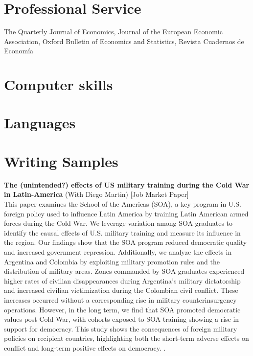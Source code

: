 \documentclass{moderncv}
\begin{document}
\section{\textbf{Professional Service}}
{The Quarterly Journal of Economics,  Journal of the European Economic Association,  Oxford Bulletin of Economics and Statistics, Revista Cuadernos de Econom\'ia \\ }


\section{\textbf{Computer skills}}
 {}{}

\section{\textbf{Languages}}

\pagebreak 
\section{\textbf{Writing Samples}}

{\textbf{The (unintended?) effects of US military training during the Cold War in Latin-America} (With Diego Martin) [Job Market Paper] \\ }
{This paper examines the School of the Americas (SOA), a key program in U.S. foreign policy used to influence Latin America by training Latin American armed forces during the Cold War. We leverage variation among SOA graduates to identify the causal effects of U.S. military training and measure its influence in the region. Our findings show that the SOA program reduced democratic quality and increased government repression. Additionally, we analyze the effects in Argentina and Colombia by exploiting military promotion rules and the distribution of military areas. Zones commanded by SOA graduates experienced higher rates of civilian disappearances during Argentina's military dictatorship and increased civilian victimization during the Colombian civil conflict. These increases occurred without a corresponding rise in military counterinsurgency operations. However, in the long term, we find that SOA promoted democratic values post-Cold War, with cohorts exposed to SOA training showing a rise in support for democracy. This study shows the consequences of foreign military policies on recipient countries, highlighting both the short-term adverse effects on conflict and long-term positive effects on democracy. .}
\vspace*{0.35cm}
\end{document}

